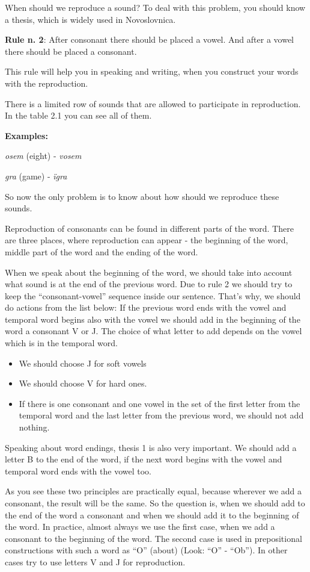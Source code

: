When should we reproduce a sound? To deal with this problem, you should know a thesis, which is widely used in Novoslovnica.

\textbf{Rule n. 2}: After consonant there should be placed a vowel. And after a vowel there should be placed a consonant.

This rule will help you in speaking and writing, when you construct your words with the reproduction.

There is a limited row of sounds that are allowed to participate in reproduction. In the table 2.1 you can see all of them.

\textbf{Examples:}

\textit{osem} (eight) \textipa{[‘osEm]} - \textit{vosem} \textipa{[‘vosEm]}

\textit{gra} (game) \textipa{[Hra]} - \textit{ïgra} \textipa{[i’Hra]}

So now the only problem is to know about how should we reproduce these sounds.

Reproduction of consonants can be found in different parts of the word. There are three places, where reproduction can appear - the beginning of the word, middle part of the word and the ending of the word.

When we speak about the beginning of the word, we should take into account what sound is at the end of the previous word. Due to rule 2 we should try to keep the “consonant-vowel” sequence inside our sentence. That’s why, we should do actions from the list below:
If the previous word ends with the vowel and temporal word begins also with the vowel we should add in the beginning of the word a consonant V or J. The choice of what letter to add depends on the vowel which is in the temporal word.
\begin{itemize}
	\item We should choose J for soft vowels
	\item We should choose V for hard ones.
	\item If there is one consonant and one vowel in the set of the first letter from the temporal word and the last letter from the previous word, we should not add nothing.
\end{itemize}

Speaking about word endings, thesis 1 is also very important. We should add a letter B to the end of the word, if the next word begins with the vowel and temporal word ends with the vowel too.

As you see these two principles are practically equal, because wherever we add a consonant, the result will be the same. So the question is, when we should add to the end of the word a consonant and when we should add it to the beginning of the word. In practice, almost always we use the first case, when we add a consonant to the beginning of the word. The second case is used in prepositional constructions with such a word as “O” (about) (Look: “O” - “Ob”). In other cases try to use letters V and J for reproduction.

